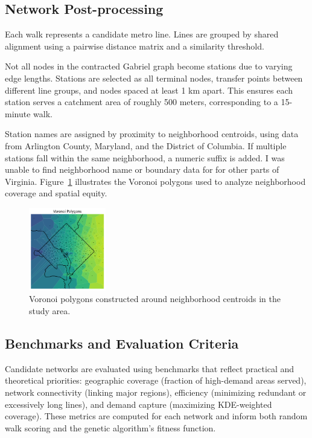 \documentclass[sigconf,nonacm]{acmart}
\begin{document}
\subsection{Network Post-processing}
Each walk represents a candidate metro line. Lines are grouped by shared alignment using a pairwise distance matrix and a similarity threshold.

Not all nodes in the contracted Gabriel graph become stations due to varying edge lengths. Stations are selected as all terminal nodes, transfer points between different line groups, and nodes spaced at least 1 km apart. This ensures each station serves a catchment area of roughly 500 meters, corresponding to a 15-minute walk.

Station names are assigned by proximity to neighborhood centroids, using data from Arlington County, Maryland, and the District of Columbia. If multiple stations fall within the same neighborhood, a numeric suffix is added. I was unable to find neighborhood name or boundary data for for other parts of Virginia. Figure~\ref{fig:voronoi} illustrates the Voronoi polygons used to analyze neighborhood coverage and spatial equity.

\begin{figure}[h]
    \centering
    \includegraphics[width=0.3\textwidth]{./img/voronoi.png}
    \caption{Voronoi polygons constructed around neighborhood centroids in the study area.}
    \label{fig:voronoi}
\end{figure}


\subsection{Benchmarks and Evaluation Criteria}
Candidate networks are evaluated using benchmarks that reflect practical and theoretical priorities: geographic coverage (fraction of high-demand areas served), network connectivity (linking major regions), efficiency (minimizing redundant or excessively long lines), and demand capture (maximizing KDE-weighted coverage). These metrics are computed for each network and inform both random walk scoring and the genetic algorithm's fitness function.
\end{document}
